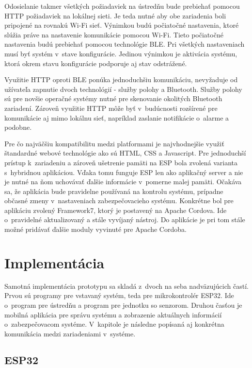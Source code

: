 Odosielanie takmer všetkých požiadaviek na ústredňu bude prebiehať pomocou HTTP požiadaviek na lokálnej sieti. Je teda nutné aby obe zariadenia boli pripojené na rovnakú Wi-Fi sieť. Výnimkou budú počiatočné nastavenia, ktoré slúžia práve na nastavenie komunikácie pomocou Wi-Fi. Tieto počiatočné nastavenia budú prebiehať pomocou technológie BLE. Pri všetkých nastaveniach musí byť systém v~stave konfigurácie. Jedinou výnimkou je aktivácia systému, ktorá okrem stavu konfigurácie podporuje aj stav odstrážené.

Využitie HTTP oproti BLE ponúka jednoduchšiu komunikáciu, nevyžaduje od užívateľa zapnutie dvoch technológií - služby polohy a Bluetooth. Služby polohy sú pre novšie operačné systémy nutné pre skenovanie okolitých Bluetooth zariadení. Zároveň využitie HTTP môže byť v~budúcnosti rozšírené pre komunikácie aj mimo lokálnu sieť, napríklad zaslanie notifikácie o~alarme a podobne. 

Pre čo najväčšiu kompatibilitu medzi platformami je najvhodnejšie využiť štandardné webové technológie ako sú HTML, CSS a Javascript. Pre jednoduchší prístup k~zariadeniu a zároveň ušetrenie pamäti na ESP bola zvolená varianta s~hybridnou aplikáciou. Vďaka tomu funguje ESP len ako aplikačný server a nie je nutné na ňom uchovávať ďalšie informácie v~pomerne malej pamäti. Očakáva sa, že aplikácia bude pravidelne používaná na kontrolu systému, prípadne občasné zmeny v~nastaveniach zabezpečovacieho systému. Konkrétne bol pre aplikáciu zvolený Framework7, ktorý je postavený na Apache Cordova. Ide o~pravidelné aktualizovaný a stále vyvíjaný nástroj. Do aplikácie je pri tom stále možné pridávať ďalšie moduly vyvinuté pre Apache Cordoba.

\chapter{Implementácia}

Samotná implementácia prototypu sa skladá z~dvoch na seba nadväzujúcich častí. Prvou sú programy pre vstavaný systém, teda pre mikrokontrolér ESP32. Ide o~program pre ústredňu a program pre jednotku so senzorom. Druhou časťou je mobilná aplikácia pre správu systému a zobrazenie aktuálnych informácií o~zabezpečovacom systéme. V~kapitole je následne popísaná aj konkrétna komunikácia medzi zariadeniami v~systéme.

\section{ESP32}

